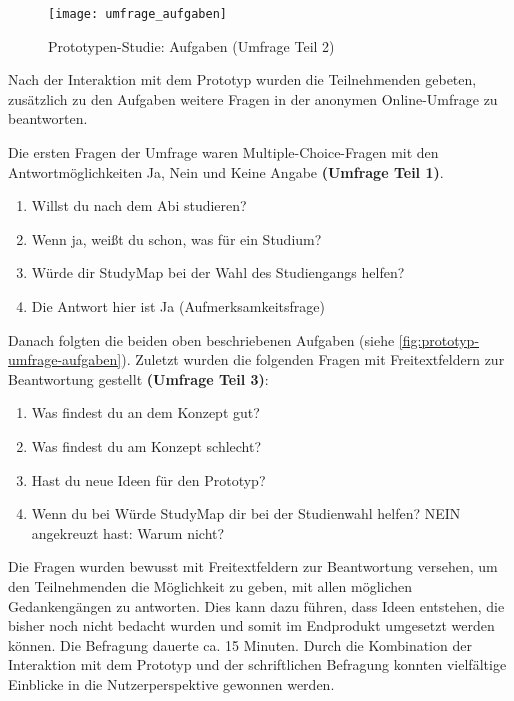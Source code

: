 \begin{figure}[H]
    \centering
    \texttt{[image: umfrage\_aufgaben]}
    \caption{Prototypen-Studie: Aufgaben (Umfrage Teil 2)}
    \label{fig:prototyp-umfrage-aufgaben}
\end{figure}

Nach der Interaktion mit dem Prototyp wurden die Teilnehmenden gebeten, zusätzlich zu den Aufgaben weitere Fragen in der anonymen Online-Umfrage zu beantworten.

Die ersten Fragen der Umfrage waren Multiple-Choice-Fragen mit den Antwortmöglichkeiten \glqq Ja\grqq{}, \glqq Nein\grqq{} und \glqq Keine Angabe\grqq{} \textbf{(Umfrage Teil 1)}.

\begin{enumerate}
    \item Willst du nach dem Abi studieren?
    \item Wenn ja, weißt du schon, was für ein Studium?
    \item Würde dir StudyMap bei der Wahl des Studiengangs helfen?
    \item Die Antwort hier ist \glqq Ja\grqq{} (Aufmerksamkeitsfrage)
\end{enumerate}

Danach folgten die beiden oben beschriebenen Aufgaben (siehe
\autoref{fig:prototyp-umfrage-aufgaben}). Zuletzt wurden die folgenden Fragen
mit Freitextfeldern zur Beantwortung gestellt \textbf{(Umfrage Teil 3)}:

\begin{enumerate}
    \item Was findest du an dem Konzept gut?
    \item Was findest du am Konzept schlecht?
    \item Hast du neue Ideen für den Prototyp?
    \item Wenn du bei \glqq Würde StudyMap dir bei der Studienwahl helfen?\grqq{} NEIN angekreuzt hast: Warum nicht?
\end{enumerate}

Die Fragen wurden bewusst mit Freitextfeldern zur Beantwortung versehen, um den Teilnehmenden die Möglichkeit zu geben, mit allen möglichen Gedankengängen zu antworten. Dies kann dazu führen, dass Ideen entstehen, die bisher noch nicht bedacht wurden und somit im Endprodukt umgesetzt werden können. Die Befragung dauerte ca. 15 Minuten. Durch die Kombination der Interaktion mit dem Prototyp und der schriftlichen Befragung konnten vielfältige Einblicke in die Nutzerperspektive gewonnen werden.

